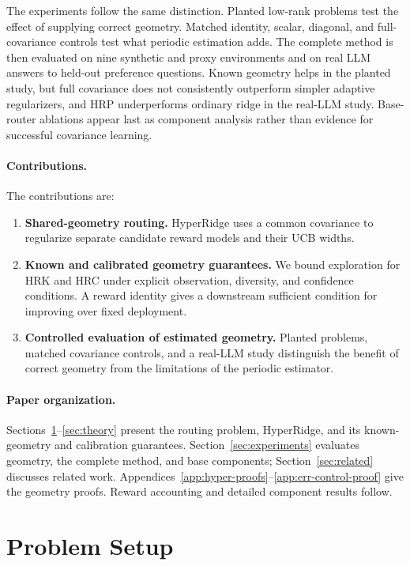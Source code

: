 \documentclass{article} %
\begin{document}
The experiments follow the same distinction. Planted low-rank problems test
the effect of supplying correct geometry. Matched identity, scalar,
diagonal, and full-covariance controls test what periodic estimation adds.
The complete method is then evaluated on nine synthetic and proxy
environments and on real LLM answers to held-out preference questions.
Known geometry helps in the planted study, but full covariance does not
consistently outperform simpler adaptive regularizers, and HRP underperforms
ordinary ridge in the real-LLM study. Base-router ablations appear last as
component analysis rather than evidence for successful covariance learning.

\paragraph{Contributions.}
The contributions are:
\begin{enumerate}
\item \textbf{Shared-geometry routing.} HyperRidge uses a common covariance
to regularize separate candidate reward models and their UCB widths.
\item \textbf{Known and calibrated geometry guarantees.} We bound exploration
for HRK and HRC under explicit observation, diversity, and confidence
conditions. A reward identity gives a downstream sufficient condition for
improving over fixed deployment.
\item \textbf{Controlled evaluation of estimated geometry.} Planted problems,
matched covariance controls, and a real-LLM study distinguish the benefit of
correct geometry from the limitations of the periodic estimator.
\end{enumerate}

\paragraph{Paper organization.}
Sections~\ref{sec:background}--\ref{sec:theory} present the routing problem,
HyperRidge, and its known-geometry and calibration guarantees.
Section~\ref{sec:experiments} evaluates geometry, the complete method, and
base components; Section~\ref{sec:related} discusses related work.
Appendices~\ref{app:hyper-proofs}--\ref{app:err-control-proof} give the
geometry proofs. Reward accounting and detailed component results follow.

\section{Problem Setup}
\label{sec:background}
\end{document}
